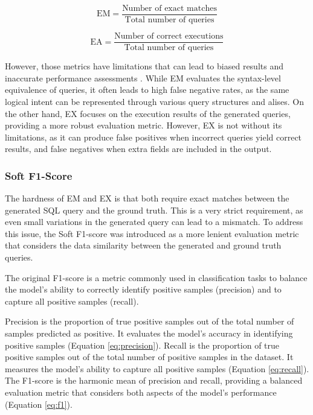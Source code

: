 \begin{equation}
    \text{EM} = \frac{\text{Number of exact matches}}{\text{Total number of queries}}
\end{equation}

\begin{equation}
    \text{EA} = \frac{\text{Number of correct executions}}{\text{Total number of queries}}
\end{equation}


However, those metrics have limitations that can lead to biased results and inaccurate performance assessments \cite{kim_flex_2024}. While EM evaluates the syntax-level equivalence of queries, it often leads to high false negative rates, as the same logical intent can be represented through various query structures and alises. On the other hand, EX focuses on the execution results of the generated queries, providing a more robust evaluation metric. However, EX is not without its limitations, as it can produce false positives when incorrect queries yield correct results, and false negatives when extra fields are included in the output.

\subsubsection{Soft F1-Score}

The hardness of EM and EX is that both require exact matches between the generated SQL query and the ground truth. This is a very strict requirement, as even small variations in the generated query can lead to a mismatch. To address this issue, the Soft F1-score was introduced as a more lenient evaluation metric that considers the data similarity between the generated and ground truth queries. 

The original F1-score is a metric commonly used in classification tasks to balance the model's ability to correctly identify positive samples (precision) and to capture all positive samples (recall). 

Precision is the proportion of true positive samples out of the total number of samples predicted as positive. It evaluates the model's accuracy in identifying positive samples (Equation \ref{eq:precision}). Recall is the proportion of true positive samples out of the total number of positive samples in the dataset. It measures the model's ability to capture all positive samples (Equation \ref{eq:recall}). The F1-score is the harmonic mean of precision and recall, providing a balanced evaluation metric that considers both aspects of the model's performance (Equation \ref{eq:f1}).

